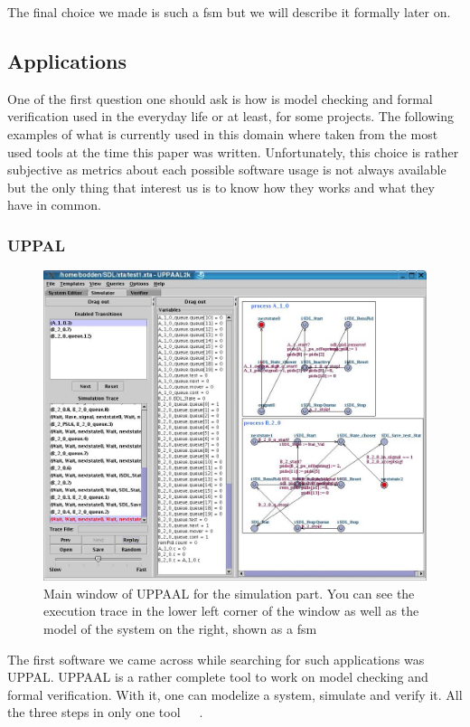 \documentclass[12pt]{article}
\begin{document}
The final choice we made is such a \gls{fsm} but we will describe it formally later on.

\subsection{Applications}

One of the first question one should ask is how is model checking and formal verification used in the everyday life or at least, for some projects. The following examples of what is currently used in this domain where taken from the most used tools at the time this paper was written. Unfortunately, this choice is rather subjective as metrics about each possible software usage is not always available but the only thing that interest us is to know how they works and what they have in common.

\subsubsection{UPPAL}

\begin{figure}
    \centering
    \includegraphics[scale=0.3]{UPPAAL_trace.jpg}
    \caption{Main window of UPPAAL for the simulation part. You can see the execution trace in the lower left corner of the window as well as the model of the system on the right, shown as a \gls{fsm}}
    \label{UPPAAL}
\end{figure}

The first software we came across while searching for such applications was UPPAL. UPPAAL is a rather complete tool to work on model checking and formal verification. With it, one can modelize a system, simulate and verify it. All the three steps in only one tool~\cite{Bengtsson1996}~\cite{Behrmann2004}~\cite{Larsen1997}.\\
\end{document}

